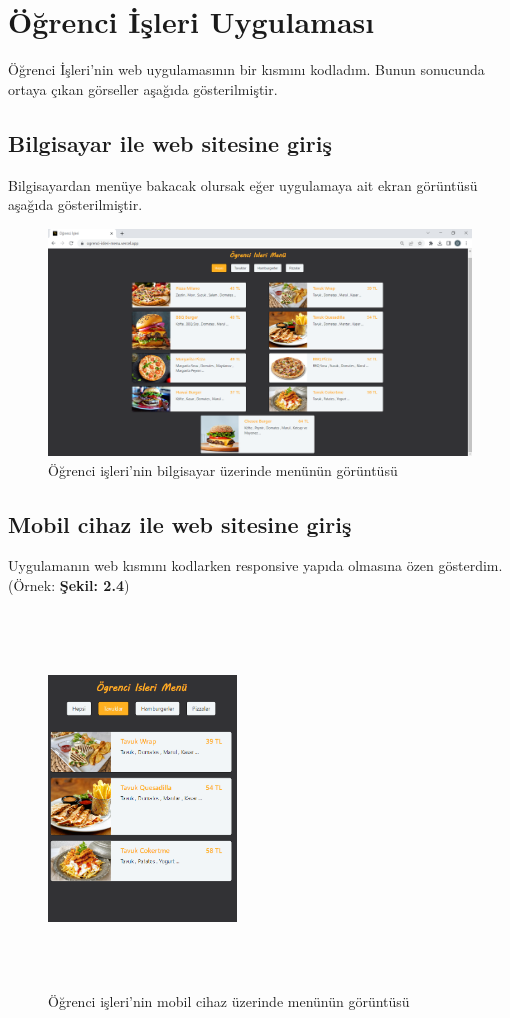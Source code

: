 \section{Öğrenci İşleri Uygulaması}
Öğrenci İşleri'nin web uygulamasının bir kısmını kodladım. Bunun sonucunda ortaya çıkan görseller aşağıda gösterilmiştir.

\subsection{Bilgisayar ile web sitesine giriş}
Bilgisayardan menüye bakacak olursak eğer uygulamaya ait ekran görüntüsü aşağıda gösterilmiştir.
\begin{figure} [h]
 \centering
 \includegraphics[width=380pt,keepaspectratio=true]{./fig/Ogrenci-Isleri}
  \caption{Öğrenci işleri'nin bilgisayar üzerinde menünün görüntüsü}
 \label{fig:ch2-2-1}
\end{figure}

\subsection{Mobil cihaz ile web sitesine giriş}
Uygulamanın web kısmını kodlarken responsive yapıda olmasına özen gösterdim. 
 (Örnek: {\bf Şekil: 2.4})
\begin{figure} [h]
 \centering
 \includegraphics[width=5cm,height=10cm,keepaspectratio=true]{./fig/Ogrenci-Mobil}
  \caption{Öğrenci işleri'nin mobil cihaz üzerinde menünün görüntüsü}
 \label{fig:ch2-2-2}
\end{figure}






